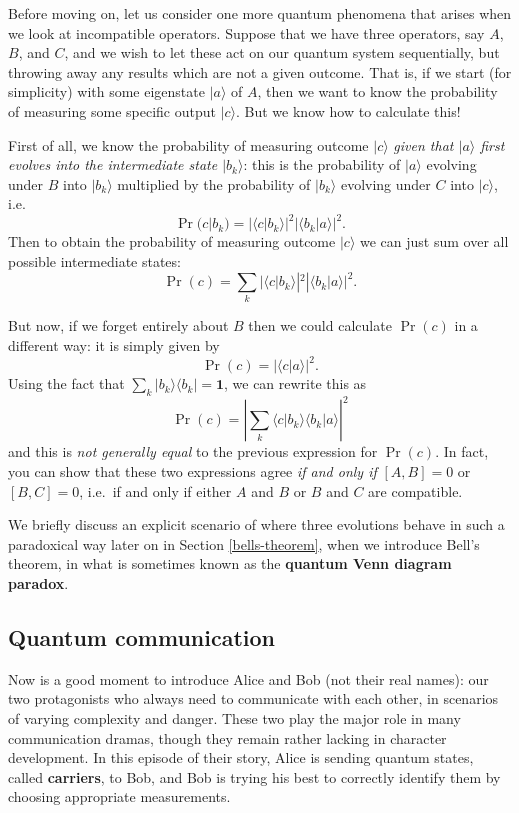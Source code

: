\documentclass[fleqn,a4paper]{article}
\theoremstyle{definition}
\theoremstyle{definition}
\theoremstyle{definition}
\theoremstyle{definition}
\theoremstyle{remark}
\begin{document}
Before moving on, let us consider one more quantum phenomena that arises when we look at incompatible operators.
Suppose that we have three operators, say \(A\), \(B\), and \(C\), and we wish to let these act on our quantum system sequentially, but throwing away any results which are not a given outcome.
That is, if we start (for simplicity) with some eigenstate \(|a\rangle\) of \(A\), then we want to know the probability of measuring some specific output \(|c\rangle\).
But we know how to calculate this!

First of all, we know the probability of measuring outcome \(|c\rangle\) \emph{given that \(|a\rangle\) first evolves into the intermediate state \(|b_k\rangle\)}: this is the probability of \(|a\rangle\) evolving under \(B\) into \(|b_k\rangle\) multiplied by the probability of \(|b_k\rangle\) evolving under \(C\) into \(|c\rangle\), i.e.
\[
  \Pr(c|b_k) = |\langle c|b_k\rangle|^2|\langle b_k|a\rangle|^2.
\]
Then to obtain the probability of measuring outcome \(|c\rangle\) we can just sum over all possible intermediate states:
\[
  \Pr(c) = \sum_{k}|\langle c|b_k\rangle|^2|\langle b_k|a\rangle|^2.
\]

But now, if we forget entirely about \(B\) then we could calculate \(\Pr(c)\) in a different way: it is simply given by
\[
  \Pr(c) = |\langle c|a\rangle|^2.
\]
Using the fact that \(\sum_{k}|b_k\rangle\langle b_k|=\mathbf{1}\), we can rewrite this as
\[
  \Pr(c) = \left|\sum_k\langle c|b_k\rangle\langle b_k|a\rangle\right|^2
\]
and this is \emph{not generally equal} to the previous expression for \(\Pr(c)\).
In fact, you can show that these two expressions agree \emph{if and only if} \([A,B]=0\) or \([B,C]=0\), i.e.~if and only if either \(A\) and \(B\) or \(B\) and \(C\) are compatible.

We briefly discuss an explicit scenario of where three evolutions behave in such a paradoxical way later on in Section \ref{bells-theorem}, when we introduce Bell's theorem, in what is sometimes known as the \textbf{quantum Venn diagram paradox}.

\hypertarget{quantum-communication}{%
\subsection{Quantum communication}\label{quantum-communication}}

Now is a good moment to introduce Alice and Bob (not their real names): our two protagonists who always need to communicate with each other, in scenarios of varying complexity and danger.
These two play the major role in many communication dramas, though they remain rather lacking in character development.
In this episode of their story, Alice is sending quantum states, called \textbf{carriers}, to Bob, and Bob is trying his best to correctly identify them by choosing appropriate measurements.
\end{document}

